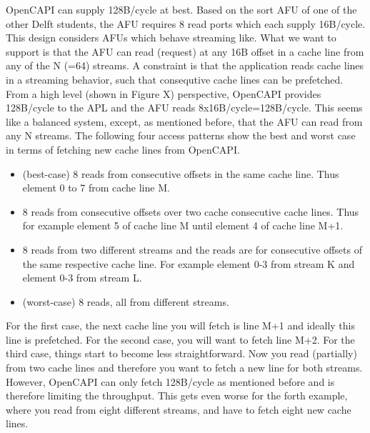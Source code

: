 OpenCAPI can supply 128B/cycle at best. Based on the sort AFU of one of the other Delft students, the AFU requires 8 read ports which each supply 16B/cycle. This design considers AFUs which behave streaming like. What we want to support is that the AFU can read (request) at any 16B offset in a cache line from any of the N (=64) streams. A constraint is that the application reads cache lines in a streaming behavior, such that consequtive cache lines can be prefetched.\\
From a high level (shown in Figure X) perspective, OpenCAPI provides 128B/cycle to the APL and the AFU reads 8x16B/cycle=128B/cycle. This seems like a balanced system, except, as mentioned before, that the AFU can read from any N streams. The following four access patterns show the best and worst case in terms of fetching new cache lines from OpenCAPI.
\begin{itemize}
	\item (best-case) 8 reads from consecutive offsets in the same cache line. Thus element 0 to 7 from cache line M.
	\item 8 reads from consecutive offsets over two cache consecutive cache lines. Thus for example element 5 of cache line M until element 4 of cache line M+1.
	\item 8 reads from two different streams and the reads are for consecutive offsets of the same respective cache line. For example element 0-3 from stream K and element 0-3 from stream L.
	\item (worst-case) 8 reads, all from different streams.
\end{itemize}
For the first case, the next cache line you will fetch is line M+1 and ideally this line is prefetched. For the second case, you will want to fetch line M+2. For the third case, things start to become less straightforward. Now you read (partially) from two cache lines and therefore you want to fetch a new line for both streams. However, OpenCAPI can only fetch 128B/cycle as mentioned before and is therefore limiting the throughput. This gets even worse for the forth example, where you read from eight different streams, and have to fetch eight new cache lines.

